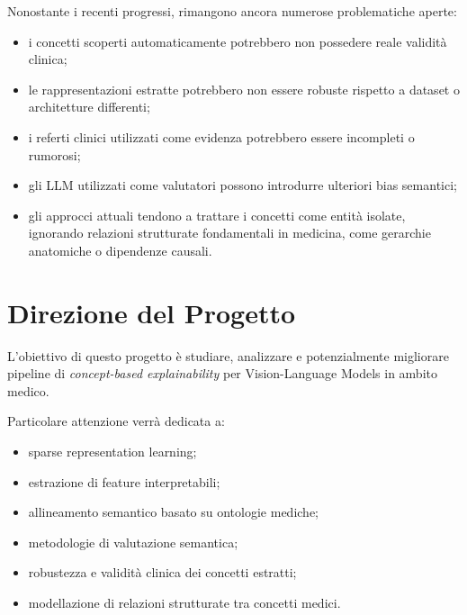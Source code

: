 Nonostante i recenti progressi, rimangono ancora numerose problematiche aperte:

\begin{itemize}
    \item i concetti scoperti automaticamente potrebbero non possedere reale validità clinica;
    
    \item le rappresentazioni estratte potrebbero non essere robuste rispetto a dataset o architetture differenti;
    
    \item i referti clinici utilizzati come evidenza potrebbero essere incompleti o rumorosi;
    
    \item gli LLM utilizzati come valutatori possono introdurre ulteriori bias semantici;
    
    \item gli approcci attuali tendono a trattare i concetti come entità isolate, ignorando relazioni strutturate fondamentali in medicina, come gerarchie anatomiche o dipendenze causali.
\end{itemize}

\section{Direzione del Progetto}

L'obiettivo di questo progetto è studiare, analizzare e potenzialmente migliorare pipeline di \textit{concept-based explainability} per Vision-Language Models in ambito medico.

Particolare attenzione verrà dedicata a:

\begin{itemize}
    \item sparse representation learning;
    
    \item estrazione di feature interpretabili;
    
    \item allineamento semantico basato su ontologie mediche;
    
    \item metodologie di valutazione semantica;
    
    \item robustezza e validità clinica dei concetti estratti;
    
    \item modellazione di relazioni strutturate tra concetti medici.
\end{itemize}